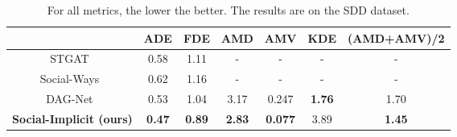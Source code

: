 \documentclass[runningheads]{llncs}
\begin{document}
\begin{table}
\centering
\caption{For all metrics, the lower the better. The results are on the SDD dataset.}
\label{tab:SDD_results}
\begin{tabular}{c|ccccc|c|}
\toprule
        &   ADE &   FDE &   AMD &   AMV &   KDE & (AMD+AMV)/2 \\
\midrule
    STGAT~\cite{huang2019stgat} & 0.58 & 1.11 & - & - &- & -\\
    Social-Ways~\cite{amirian2019social} & 0.62 & 1.16& - & - &- & -\\    
    DAG-Net~\cite{monti2021dag} &  0.53 & 1.04 & 3.17 & 0.247 & \textbf{1.76}& 1.70  \\
    \midrule
    \textbf{Social-Implicit (ours)} & \textbf{0.47} & \textbf{0.89} & \textbf{2.83} & \textbf{0.077} & 3.89 & \textbf{1.45}\\
\bottomrule
\end{tabular}

\end{table}
\end{document}
